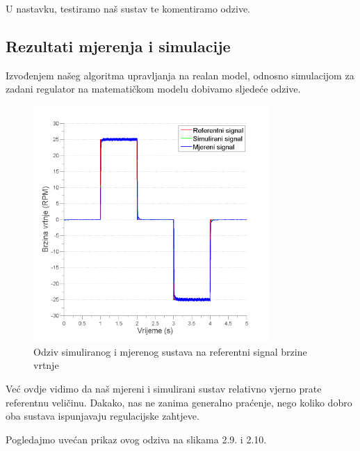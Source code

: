 \documentclass[12pt,a4paper]{article}
\begin{document}
U nastavku, testiramo naš sustav te komentiramo odzive.

\newpage


\subsection{Rezultati mjerenja i simulacije}


Izvođenjem našeg algoritma upravljanja na realan model, odnosno simulacijom za zadani regulator na matematičkom modelu dobivamo sljedeće odzive.

\begin{figure}[h]
	\begin{center}
	\includegraphics[width=0.8\textwidth]{Odziv_6x_2.png}
    \caption{Odziv simuliranog i mjerenog sustava na referentni signal brzine vrtnje}
    \end{center}
\end{figure}


Već ovdje vidimo da naš mjereni i simulirani sustav relativno vjerno prate referentnu veličinu. Dakako, nas ne zanima generalno praćenje, nego koliko dobro oba sustava ispunjavaju regulacijske zahtjeve.

Pogledajmo uvećan prikaz ovog odziva na slikama 2.9. i 2.10.

\newpage
\end{document}

